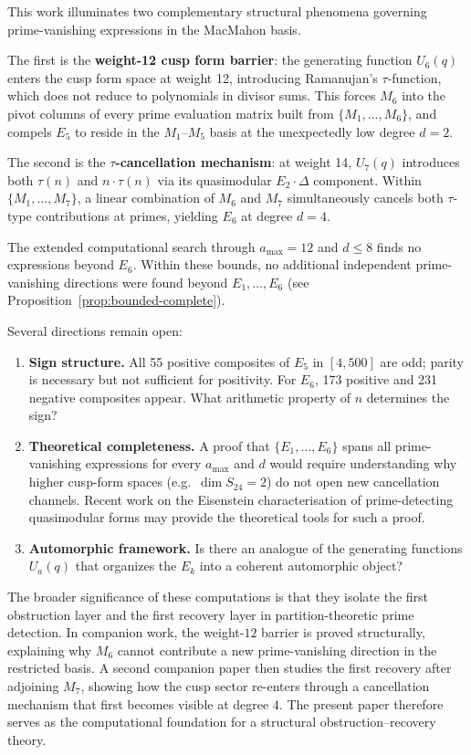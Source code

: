 \documentclass[11pt]{article}
\begin{document}
This work illuminates two complementary structural phenomena governing prime-vanishing
expressions in the MacMahon basis.

The first is the \textbf{weight-12 cusp form barrier}: the generating function $U_6(q)$
enters the cusp form space at weight 12, introducing Ramanujan's $\tau$-function, which
does not reduce to polynomials in divisor sums.
This forces $M_6$ into the pivot columns of every prime evaluation matrix built from
$\{M_1,\dots,M_6\}$, and compels $E_5$ to reside in the $M_1$--$M_5$ basis at the
unexpectedly low degree $d=2$.

The second is the \textbf{$\tau$-cancellation mechanism}: at weight 14, $U_7(q)$ introduces
both $\tau(n)$ and $n\cdot\tau(n)$ via its quasimodular $E_2\cdot\Delta$ component.
Within $\{M_1,\dots,M_7\}$, a linear combination of $M_6$ and $M_7$ simultaneously cancels
both $\tau$-type contributions at primes, yielding $E_6$ at degree $d=4$.

The extended computational search through $a_{\max}=12$ and $d\le 8$ finds no expressions
beyond $E_6$.
Within these bounds, no additional independent prime-vanishing directions were found
beyond $E_1,\dots,E_6$ (see Proposition~\ref{prop:bounded-complete}).

Several directions remain open:
\begin{enumerate}[leftmargin=*]
\item \textbf{Sign structure.} All 55 positive composites of $E_5$ in $[4,500]$ are odd;
parity is necessary but not sufficient for positivity.
For $E_6$, 173 positive and 231 negative composites appear.
What arithmetic property of $n$ determines the sign?
\item \textbf{Theoretical completeness.} A proof that $\{E_1,\dots,E_6\}$ spans all
prime-vanishing expressions for every $a_{\max}$ and $d$ would require understanding why
higher cusp-form spaces (e.g.\ $\dim S_{24}=2$) do not open new cancellation channels.
Recent work on the Eisenstein characterisation of prime-detecting quasimodular forms
\cite{VIMOS2025,KKL2025,KwonLee2026} may provide the theoretical tools for such a proof.
\item \textbf{Automorphic framework.} Is there an analogue of the generating functions
$U_a(q)$ that organizes the $E_k$ into a coherent automorphic object?
\end{enumerate}

The broader significance of these computations is that they isolate the first obstruction
layer and the first recovery layer in partition-theoretic prime detection.
In companion work, the weight-$12$ barrier is proved structurally, explaining why $M_6$
cannot contribute a new prime-vanishing direction in the restricted basis.
A second companion paper then studies the first recovery after adjoining $M_7$, showing how
the cusp sector re-enters through a cancellation mechanism that first becomes visible at
degree $4$.
The present paper therefore serves as the computational foundation for a structural
obstruction--recovery theory.
\end{document}
